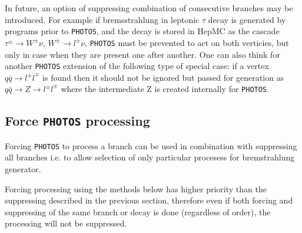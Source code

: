 \documentclass[]{Photos_interface_design}
\begin{document}
In future, an option of suppressing combination of consecutive branches may be introduced.
For example if bremsstrahlung in leptonic $\tau$ decay is generated by
programs prior to {\tt PHOTOS}, and the decay is stored in HepMC as the cascade
$\tau^\pm \to W^\pm \nu$, $W^\pm \to l^\pm \nu$, {\tt PHOTOS} must
be prevented to act on both verticies, but only in case when they are present one after another.
One can also think for another {\tt PHOTOS} extension of the following type of special case: if a vertex $q
\bar q \to l^\pm l^\mp$ is found then it should not be ignored but
passed for generation as $q \bar q \to Z \to l^\pm l^\mp$ where
the intermediate Z is created internally for {\tt PHOTOS}.

\subsection{Force {\tt PHOTOS} processing }
\label{section:force}

Forcing {\tt PHOTOS} to process a branch can be used in combination with
suppressing all branches i.e. to allow selection of only particular
procesess for bremstrahlung generator.

Forcing processing using the methods below has higher priority than the suppressing described
in the previous section, therefore even if both forcing and suppressing of the same
branch or decay is done (regardless of order), the processing will not be
suppressed.
\end{document}
